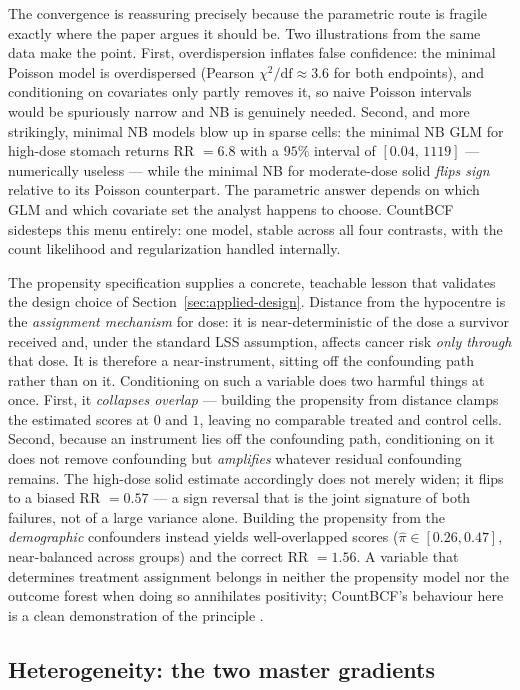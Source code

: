 \documentclass[11pt]{article}
\begin{document}
The convergence is reassuring precisely because the parametric route is
fragile exactly where the paper argues it should be. Two illustrations from
the same data make the point. First, overdispersion inflates false
confidence: the minimal Poisson model is overdispersed (Pearson
$\chi^2/\text{df}\approx 3.6$ for both endpoints), and conditioning on
covariates only partly removes it, so naive Poisson intervals would be
spuriously narrow and NB is genuinely needed. Second, and more strikingly,
minimal NB models blow up in sparse cells: the minimal NB GLM for high-dose
stomach returns RR $=6.8$ with a $95\%$ interval of $[0.04,\,1119]$ ---
numerically useless --- while the minimal NB for moderate-dose solid
\emph{flips sign} relative to its Poisson counterpart. The parametric answer
depends on which GLM and which covariate set the analyst happens to choose.
CountBCF sidesteps this menu entirely: one model, stable across all four
contrasts, with the count likelihood and regularization handled internally.

The propensity specification supplies a concrete, teachable lesson that
validates the design choice of Section~\ref{sec:applied-design}. Distance from
the hypocentre is the \emph{assignment mechanism} for dose: it is
near-deterministic of the dose a survivor received and, under the standard LSS
assumption, affects cancer risk \emph{only through} that dose. It is therefore
a near-instrument, sitting off the confounding path rather than on it.
Conditioning on such a variable does two harmful things at once. First, it
\emph{collapses overlap} --- building the propensity from distance clamps the
estimated scores at $0$ and $1$, leaving no comparable treated and control
cells. Second, because an instrument lies off the confounding path,
conditioning on it does not remove confounding but \emph{amplifies} whatever
residual confounding remains. The high-dose solid estimate accordingly does
not merely widen; it flips to a biased RR $=0.57$ --- a sign reversal that is
the joint signature of both failures, not of a large variance alone. Building
the propensity from the \emph{demographic} confounders instead yields
well-overlapped scores ($\hat\pi\in[0.26,0.47]$, near-balanced across groups)
and the correct RR $=1.56$. A variable that determines treatment assignment
belongs in neither the propensity model nor the outcome forest when doing so
annihilates positivity; CountBCF's behaviour here is a clean demonstration of
the principle \citep{rosenbaum1983central}.

\subsection{Heterogeneity: the two master gradients}
\label{sec:applied-cate}
\end{document}
